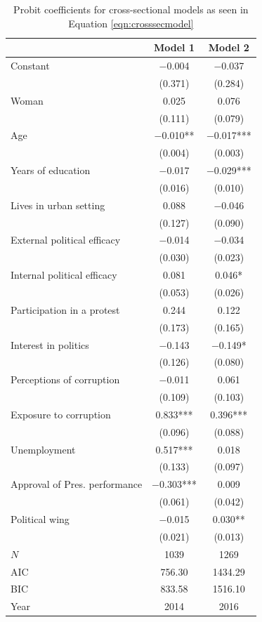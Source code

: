 \documentclass[12pt,a4]{article}\usepackage[]{graphicx}\usepackage[]{xcolor}
\begin{document}
\begin{table}[htbp]
\begin{center}
\caption{Probit coefficients for cross-sectional models as seen in Equation \ref{eqn:crosssecmodel}}
\label{tab:complexmodcprob}

\begin{tabular}[t]{lcc}
\toprule
  & Model 1 & Model 2\\
\midrule
Constant & \num{-0.004} & \num{-0.037}\\
 & (\num{0.371}) & (\num{0.284})\\
Woman & \num{0.025} & \num{0.076}\\
 & (\num{0.111}) & (\num{0.079})\\
Age & \num{-0.010}** & \num{-0.017}***\\
 & (\num{0.004}) & (\num{0.003})\\
Years of education & \num{-0.017} & \num{-0.029}***\\
 & (\num{0.016}) & (\num{0.010})\\
Lives in urban setting & \num{0.088} & \num{-0.046}\\
 & (\num{0.127}) & (\num{0.090})\\
External political efficacy & \num{-0.014} & \num{-0.034}\\
 & (\num{0.030}) & (\num{0.023})\\
Internal political efficacy & \num{0.081} & \num{0.046}*\\
 & (\num{0.053}) & (\num{0.026})\\
Participation in a protest & \num{0.244} & \num{0.122}\\
 & (\num{0.173}) & (\num{0.165})\\
Interest in politics & \num{-0.143} & \num{-0.149}*\\
 & (\num{0.126}) & (\num{0.080})\\
Perceptions of corruption & \num{-0.011} & \num{0.061}\\
 & (\num{0.109}) & (\num{0.103})\\
Exposure to corruption & \num{0.833}*** & \num{0.396}***\\
 & (\num{0.096}) & (\num{0.088})\\
Unemployment & \num{0.517}*** & \num{0.018}\\
 & (\num{0.133}) & (\num{0.097})\\
Approval of Pres. performance & \num{-0.303}*** & \num{0.009}\\
 & (\num{0.061}) & (\num{0.042})\\
Political wing & \num{-0.015} & \num{0.030}**\\
 & (\num{0.021}) & (\num{0.013})\\
\midrule
$N$ & \num{1039} & \num{1269}\\
AIC & \num{756.30} & \num{1434.29}\\
BIC & \num{833.58} & \num{1516.10}\\
Year & 2014 & 2016\\
\bottomrule
\end{tabular}



\end{center}
\end{table}
\end{document}
